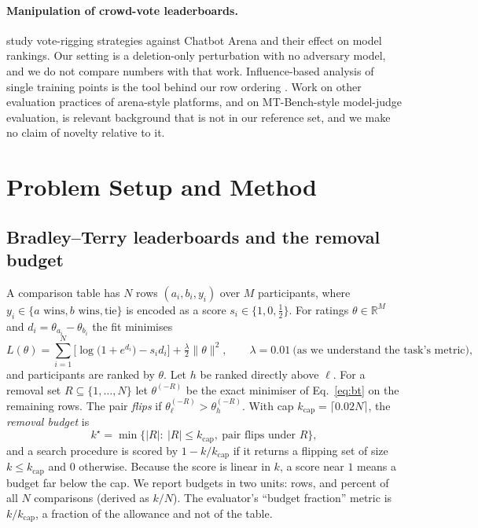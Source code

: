 \documentclass{article}
\newcommand{\kcap}{k_{\mathrm{cap}}}
\newcommand{\hi}{h}
\newcommand{\lo}{\ell}
\begin{document}
\paragraph{Manipulation of crowd-vote leaderboards.} \citet{https://doi.org/10.48550/arxiv.2501.17858} study vote-rigging strategies against Chatbot Arena and their effect on model rankings. Our setting is a deletion-only perturbation with no adversary model, and we do not compare numbers with that work. Influence-based analysis of single training points is the tool behind our row ordering \citep{https://doi.org/10.48550/arxiv.1703.04730}. Work on other evaluation practices of arena-style platforms, and on MT-Bench-style model-judge evaluation, is relevant background that is not in our reference set, and we make no claim of novelty relative to it.

\section{Problem Setup and Method}
\subsection{Bradley--Terry leaderboards and the removal budget}
A comparison table has $N$ rows $(a_i,b_i,y_i)$ over $M$ participants, where $y_i\in\{\text{$a$ wins},\text{$b$ wins},\text{tie}\}$ is encoded as a score $s_i\in\{1,0,\tfrac12\}$. For ratings $\theta\in\mathbb{R}^M$ and $d_i=\theta_{a_i}-\theta_{b_i}$ the fit minimises
\begin{equation}
L(\theta)=\sum_{i=1}^{N}\Big[\log\!\big(1+e^{d_i}\big)-s_i d_i\Big]+\tfrac{\lambda}{2}\lVert\theta\rVert^2,\qquad \lambda=0.01\ \text{(as we understand the task's metric)},
\label{eq:bt}
\end{equation}
and participants are ranked by $\theta$. Let $\hi$ be ranked directly above $\lo$. For a removal set $R\subseteq\{1,\dots,N\}$ let $\theta^{(-R)}$ be the exact minimiser of Eq.~\eqref{eq:bt} on the remaining rows. The pair \emph{flips} if $\theta^{(-R)}_{\lo}>\theta^{(-R)}_{\hi}$. With cap $\kcap=\lceil 0.02N\rceil$, the \emph{removal budget} is
\begin{equation}
k^\star=\min\{|R|:\ |R|\le\kcap,\ \text{pair flips under }R\},
\end{equation}
and a search procedure is scored by $1-k/\kcap$ if it returns a flipping set of size $k\le\kcap$ and $0$ otherwise. Because the score is linear in $k$, a score near $1$ means a budget far below the cap. We report budgets in two units: rows, and percent of all $N$ comparisons (derived as $k/N$). The evaluator's ``budget fraction'' metric is $k/\kcap$, a fraction of the allowance and not of the table.
\end{document}
